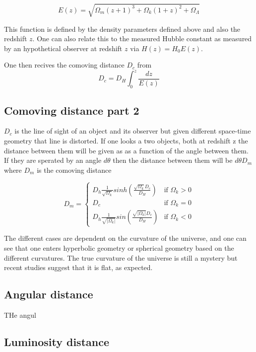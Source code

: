 \documentclass[11pt]{article}
\begin{document}
\begin{equation}
    E(z)  = \sqrt{\Omega_m(z+1)^3 +\Omega_k (1+z)^2 + \Omega_\Lambda  }
\end{equation}


This function is defined by the density parameters defined above and also the redshift $z$. One can also relate this to the measured Hubble constant as measured by an hypothetical observer at redshift $z$ via $ H(z) = H_0 E(z)$. 


One then recives the comoving distance $D_c$ from 
\begin{equation}
    D_c =D_H \int_0^z\frac{dz}{E(z)}
\end{equation}
\subsection{Comoving distance part 2}
$D_c$ is the line of sight of an object and its observer but given different space-time geometry that line is distorted. If one looks a two objects, both at redshift z the distance between them will be given as as a function of the angle between them. If they are sperated by an angle $d\theta$ then the distance between them will be $d\theta D_m$ where $D_m$ is the comoving distance


$$
D_m =
\begin{cases}
  D_h\frac{1}{\sqrt{\Omega_k}}sinh(\frac{\sqrt{\Omega_k}D_c}{D_H}) & \text{if } \Omega_k > 0 \\
  D_c& \text{if } \Omega_k = 0 \\
  D_h\frac{1}{\sqrt{|\Omega_k|}}sin(\frac{\sqrt{|\Omega_k|}D_c}{D_H}) & \text{if } \Omega_k < 0
\end{cases}
$$

The different cases are dependent on the curvature of the universe, and one can see that one enters hyperbolic geometry or spherical geometry based on the different curvatures. The true curvature of the universe is still a mystery but recent studies suggest that it is flat, as expected. 


\subsection{Angular distance}


THe angul


\subsection{Luminosity distance}
\end{document}
